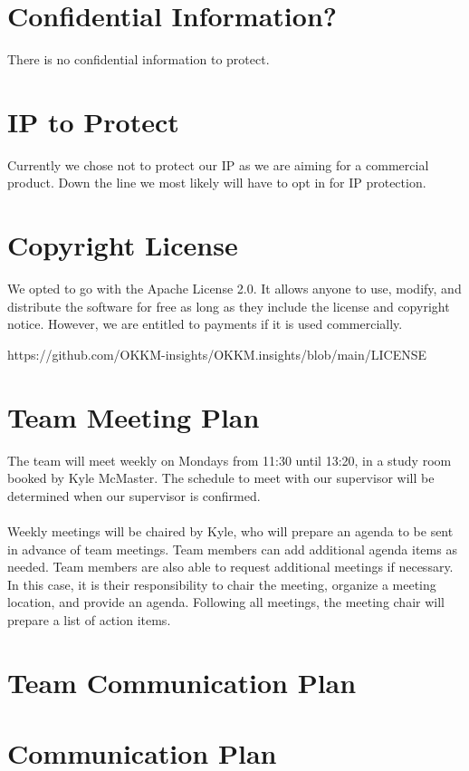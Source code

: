 \documentclass{article}
\begin{document}
\section{Confidential Information?}

There is no confidential information to protect.

\section{IP to Protect}

Currently we chose not to protect our IP as we are aiming for a commercial product. Down the line we most likely will have to opt in for IP protection.

\section{Copyright License}

We opted to go with the Apache License 2.0. It allows anyone to use, modify, and distribute the software for free as long as they include the license and copyright notice. However, we are entitled to payments if it is used commercially.

https://github.com/OKKM-insights/OKKM.insights/blob/main/LICENSE

\section{Team Meeting Plan}
The team will meet weekly on Mondays from 11:30 until 13:20, in a study room booked by Kyle McMaster.
The schedule to meet with our supervisor will be determined when our supervisor is confirmed.\\\\
Weekly meetings will be chaired by Kyle, who will prepare an agenda to be sent in advance of team meetings. Team members can add additional agenda items as
needed. Team members are also able to request additional meetings if necessary. In this case, it is their responsibility to chair the meeting, 
organize a meeting location, and provide an agenda. Following all meetings, the meeting chair will prepare a list of action items.

\section{Team Communication Plan}

\section{Communication Plan}
\end{document}
